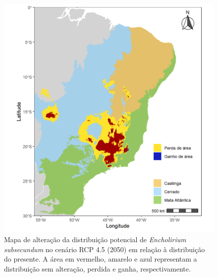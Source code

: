 \documentclass[
  11pt,
]{article}
\begin{document}
\begin{figure}
\centering
\includegraphics[width=1\textwidth,height=\textheight]{../Graficos/E_subsecundum_mapas_feitos/alteracao_RCP45.jpeg}
\caption{Mapa de alteração da distribuição potencial de
\emph{Encholirium subsecundum} no cenário RCP 4.5 (2050) em relação à
distribuição do presente. A área em vermelho, amarelo e azul representam
a distribuição sem alteração, perdida e ganha, respectivamente.}
\end{figure}
\end{document}
